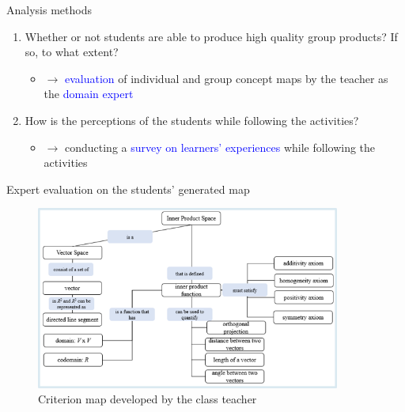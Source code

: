 \begin{frame}{Analysis methods}
    \begin{enumerate}
    \item <1-2,5> Whether or not students are able to produce high quality group products? If so, to what extent?
    \begin{itemize}
        \item <2,5> $\longrightarrow$ \textcolor{blue}{evaluation} of individual and group concept maps by the teacher as the \textcolor{blue}{domain expert}
    \end{itemize}
    
    
    \item <3-4,5> How is the perceptions of the students while following the activities?
    \begin{itemize}
        \item <4,5> $\longrightarrow$ conducting a \textcolor{blue}{survey on learners' experiences} while following the activities
    \end{itemize}
    \end{enumerate}
\end{frame}

\begin{frame}{Expert evaluation on the students' generated map}
    \begin{figure}[tb]
        \begin{center}
            \includegraphics[width=100mm]{images/expert_map.png}
        \end{center}
        \caption{Criterion map developed by the class teacher}
    \end{figure}
\end{frame}

